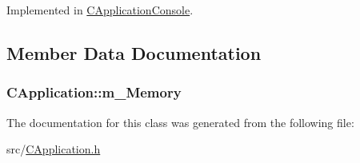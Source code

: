 Implemented in \hyperlink{classCApplicationConsole_a4bca66a2f575557ca929d2fa8c8f9028}{C\+Application\+Console}.



\subsection{Member Data Documentation}
\subsubsection[{\texorpdfstring{m\+\_\+\+Memory}{m_Memory}}]{ C\+Application\+::m\+\_\+\+Memory\hspace{0.3cm}{\ttfamily [protected]}}\hypertarget{classCApplication_a338eac28666e5f1577716eb7097ffadb}{}\label{classCApplication_a338eac28666e5f1577716eb7097ffadb}


The documentation for this class was generated from the following file\+:\begin{DoxyCompactItemize}
\item 
src/\hyperlink{CApplication_8h}{C\+Application.\+h}\end{DoxyCompactItemize}
